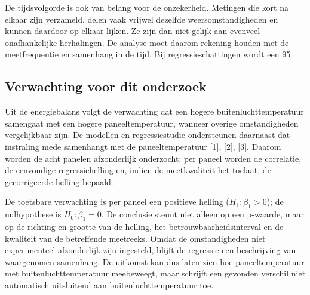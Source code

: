 \documentclass[12pt,a4paper]{article}
\begin{document}
De tijdsvolgorde is ook van belang voor de onzekerheid. Metingen die kort na elkaar zijn verzameld, delen vaak vrijwel dezelfde weersomstandigheden en kunnen daardoor op elkaar lijken. Ze zijn dan niet gelijk aan evenveel onafhankelijke herhalingen. De analyse moet daarom rekening houden met de meetfrequentie en samenhang in de tijd. Bij regressieschattingen wordt een 95%

\subsection{Verwachting voor dit onderzoek}

Uit de energiebalans volgt de verwachting dat een hogere buitenluchttemperatuur samengaat met een hogere paneeltemperatuur, wanneer overige omstandigheden vergelijkbaar zijn. De modellen en regressiestudie ondersteunen daarnaast dat instraling mede samenhangt met de paneeltemperatuur [1], [2], [3]. Daarom worden de acht panelen afzonderlijk onderzocht: per paneel worden de correlatie, de eenvoudige regressiehelling en, indien de meetkwaliteit het toelaat, de gecorrigeerde helling bepaald.

De toetsbare verwachting is per paneel een positieve helling (\(H_1:\beta_1>0\)); de nulhypothese is \(H_0:\beta_1=0\). De conclusie steunt niet alleen op een p-waarde, maar op de richting en grootte van de helling, het betrouwbaarheidsinterval en de kwaliteit van de betreffende meetreeks. Omdat de omstandigheden niet experimenteel afzonderlijk zijn ingesteld, blijft de regressie een beschrijving van waargenomen samenhang. De uitkomst kan dus laten zien hoe paneeltemperatuur met buitenluchttemperatuur meebeweegt, maar schrijft een gevonden verschil niet automatisch uitsluitend aan buitenluchttemperatuur toe.
\end{document}
